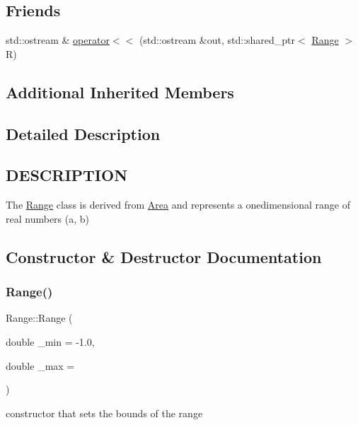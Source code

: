 \subsection*{Friends}
\begin{DoxyCompactItemize}
\item 
std\+::ostream \& \hyperlink{class_range_a4720a1c61f7e023f4ae120b4eeb5a1da}{operator$<$$<$} (std\+::ostream \&out, std\+::shared\+\_\+ptr$<$ \hyperlink{class_range}{Range} $>$ R)
\end{DoxyCompactItemize}
\subsection*{Additional Inherited Members}


\subsection{Detailed Description}
\hypertarget{function_8h_DESCRIPTION}{}\subsection{D\+E\+S\+C\+R\+I\+P\+T\+I\+ON}\label{function_8h_DESCRIPTION}
The \hyperlink{class_range}{Range} class is derived from \hyperlink{class_area}{Area} and represents a onedimensional range of real numbers (a, b) 

\subsection{Constructor \& Destructor Documentation}
\mbox{\label{class_range_aad92f98f8860648f7d6756f0c07d66ba}} 
\subsubsection{\texorpdfstring{Range()}{Range()}}
{\footnotesize\ttfamily Range\+::\+Range (\begin{DoxyParamCaption}\item[{double}]{\+\_\+min = {\ttfamily -\/1.0},  }\item[{double}]{\+\_\+max = {} }\end{DoxyParamCaption})\hspace{0.3cm}{\ttfamily [inline]}}

constructor that sets the bounds of the range 

